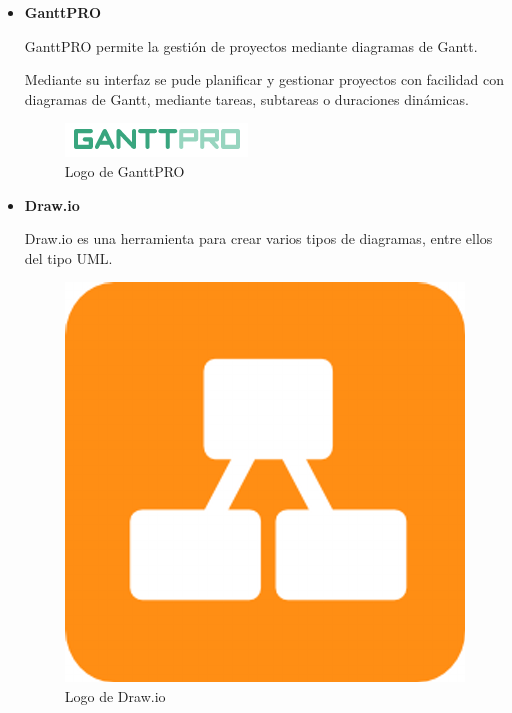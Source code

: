 \begin{itemize}
	
	\item \textbf{GanttPRO}
	
	GanttPRO \cite{ganttpro} permite la gestión de proyectos mediante diagramas de Gantt.

	Mediante su interfaz se pude planificar y gestionar proyectos con facilidad con diagramas de Gantt, mediante tareas, subtareas o duraciones dinámicas. 	

	\bigskip
	\begin{figure}[h]
		\centering
		\includegraphics[width=0.3\linewidth]{../images/ganttprologo}
		\caption[Logo de GanttPRO]{Logo de GanttPRO}
		\label{fig:ganttprologo}
	\end{figure}

	\item \textbf{Draw.io}
	
	Draw.io \cite{drawioweb} es una herramienta para crear varios tipos de diagramas, entre ellos del tipo UML.
	
	\bigskip
	\begin{figure}[h]
		\centering
		\includegraphics[width=0.3\linewidth]{../images/drawiologo}
		\caption[Logo de Draw.io]{Logo de Draw.io}
		\label{fig:drawiologo}
	\end{figure}
					
\end{itemize}

